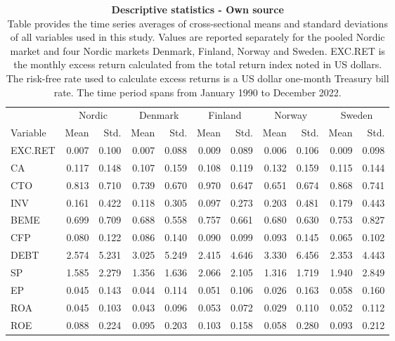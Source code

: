 \documentclass[12pt]{article}
\begin{document}
\begin{table}[ht] 
\footnotesize
\caption[Descriptive statistics]{\textbf{Descriptive statistics \textnormal{- Own source}}\\ Table provides the time series averages of cross-sectional means and standard deviations of all variables used in this study. Values are reported separately for the pooled Nordic market and four Nordic markets Denmark, Finland, Norway and Sweden. EXC.RET is the monthly excess return calculated from the total return index noted in US dollars. The risk-free rate used to calculate excess returns is a US dollar one-month Treasury bill rate. The time period spans from January 1990 to December 2022.}
 \label{table:DescriptiveStatistics}
\centering
\begin{tabularx}{\textwidth}{@{\extracolsep{1pt}} X r r r r r r r r r r} 
\toprule
 & \multicolumn{2}{c}{Nordic} & \multicolumn{2}{c}{Denmark} & \multicolumn{2}{c}{Finland} & \multicolumn{2}{c}{Norway}&\multicolumn{2}{c}{Sweden} \\
\cmidrule{2-3}\cmidrule{4-5}\cmidrule{6-7}\cmidrule{8-9}\cmidrule{10-11}
Variable 		& Mean 	& Std. 	& Mean 	& Std. 	& Mean 	& Std. 	& Mean 	& Std. 	& Mean 	& Std. \\
\midrule
EXC.RET		& 0.007 	& 0.100	& 0.007 	& 0.088	& 0.009	& 0.089	& 0.006	& 0.106	& 0.009	& 0.098 \\
CA		 	& 0.117 	& 0.148	& 0.107 	& 0.159	& 0.108	& 0.119	& 0.132	& 0.159	& 0.115	& 0.144 \\
CTO		 	& 0.813  	& 0.710 	& 0.739 	& 0.670	& 0.970	& 0.647	& 0.651	& 0.674	& 0.868	& 0.741 \\
INV 			& 0.161 	& 0.422	& 0.118 	& 0.305	& 0.097	& 0.273	& 0.203	& 0.481	& 0.179	& 0.443 \\
BEME	 	& 0.699 	& 0.709	& 0.688 	& 0.558	& 0.757	& 0.661	& 0.680	& 0.630	& 0.753	& 0.827 \\
CFP	 		& 0.080 	& 0.122	& 0.086 	& 0.140	& 0.090	& 0.099	& 0.093	& 0.145	& 0.065	& 0.102 \\
DEBT	 	& 2.574 	& 5.231	& 3.025 	& 5.249	& 2.415	& 4.646	& 3.330	& 6.456	& 2.353	& 4.443 \\
SP 			& 1.585	& 2.279	& 1.356 	& 1.636	& 2.066	& 2.105	& 1.316	& 1.719	& 1.940	& 2.849 \\
EP 			& 0.045	& 0.143	& 0.044 	& 0.114	& 0.051	& 0.106	& 0.026	& 0.163	& 0.058	& 0.160 \\
ROA 		& 0.045	& 0.103	& 0.043 	& 0.096	& 0.053	& 0.072	& 0.029	& 0.110	& 0.052	& 0.112 \\
ROE 		& 0.088 	& 0.224	& 0.095 	& 0.203	& 0.103	& 0.158	& 0.058	& 0.280	& 0.093	& 0.212 \\

\end{tabularx}
\end{table}
\end{document}
